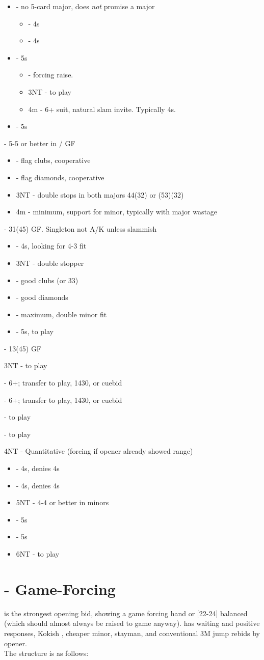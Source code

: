 \documentclass[12pt]{report}
\newcommand{\n}{\\}
\newcommand{\ul}[1]{\begin{itemize}#1\end{itemize}}
\newcommand{\li}{\item[~]}
\newcommand{\bidsection}[2]{\section{\texorpdfstring{#1}{#2}}}
\begin{document}
{        \ul {
            \li {} - no 5-card major, does \textit{not} promise a major
            \ul {
                \li \he3 - 4\sp{}s
                \li \sp3 - 4\he{}s
            }
            \li \he3 - 5\he{}s
            \ul {
                \li \sp3 - forcing \he{} raise.
                \li 3NT - to play
                \li 4m - 6+ suit, natural slam invite.  Typically 4\sp{}s.
            }
            \li \sp3 - 5\sp{}s
        }
        \li {} - 5-5 or better in \cl{}/\di{} GF
        \ul {
            \li {} - flag clubs, cooperative
            \li \sp3 - flag diamonds, cooperative
            \li 3NT - double stops in both majors 44(32) or (53)(32)
            \li 4m - minimum, support for minor, typically with major wastage
        }
        \li {} - 31(45) GF.  Singleton not A/K unless slammish
        \ul {
            \li {} - 4\sp{}s, looking for 4-3 fit
            \li 3NT - double stopper
            \li \cl4 - good clubs (or 33)
            \li \di4 - good diamonds
            \li \he4 - maximum, double minor fit
            \li \sp4 - 5\sp{}s, to play
        }
        \li {} - 13(45) GF
        \li 3NT - to play
        \li {} - 6+\he{}; transfer to play, 1430, or cuebid
        \li {} - 6+\sp{}; transfer to play, 1430, or cuebid
        \li {} - to play
        \li {} - to play
        \li 4NT - Quantitative (forcing if opener already showed range)
        \ul {
            \li {} - 4\cl{}s, denies 4\di{}s
            \li \di5 - 4\di{}s, denies 4\cl{}s
            \li 5NT - 4-4 or better in minors
            \li \cl6 - 5\cl{}s
            \li \di6 - 5\di{}s
            \li 6NT - to play
        }
    }
\newpage
\bidsection{ - Game-Forcing}{2♣ - Game-Forcing} \label{2:7}

     is the strongest opening bid, showing a game forcing hand or [22-24] balanced (which should almost always be raised to game anyway).   has waiting and positive responses, Kokish , cheaper minor,  stayman, and conventional 3M jump rebids by opener.\n
    
    The structure is as follows:
\end{document}
